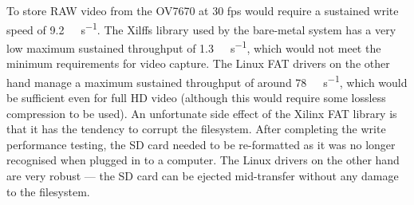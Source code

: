 To store RAW video from the OV7670 at 30 \gls{fps} would require a sustained write speed of \SI{9.2}{\mega\byte\per\second}. The Xilffs library used by the bare-metal system has a very low maximum sustained throughput of \SI{1.3}{\mega\byte\per\second}, which would not meet the minimum requirements for video capture. The Linux FAT drivers on the other hand manage a maximum sustained throughput of around \SI{78}{\mega\byte\per\second}, which would be sufficient even for full HD video (although this would require some lossless compression to be used). An unfortunate side effect of the Xilinx FAT library is that it has the tendency to corrupt the filesystem. After completing the write performance testing, the SD card needed to be re-formatted as it was no longer recognised when plugged in to a computer. The Linux drivers on the other hand are very robust --- the SD card can be ejected mid-transfer without any damage to the filesystem.
